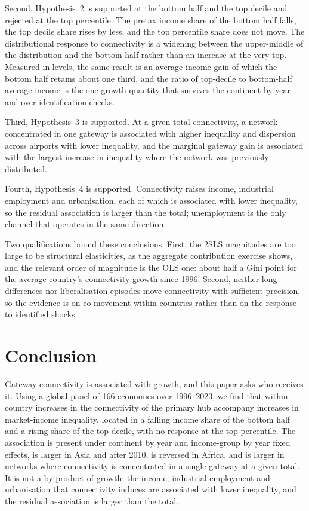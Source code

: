 Second, Hypothesis~2 is supported at the bottom half and the top decile and rejected at the top percentile. The pretax income share of the bottom half falls, the top decile share rises by less, and the top percentile share does not move. The distributional response to connectivity is a widening between the upper-middle of the distribution and the bottom half rather than an increase at the very top. Measured in levels, the same result is an average income gain of which the bottom half retains about one third, and the ratio of top-decile to bottom-half average income is the one growth quantity that survives the continent by year and over-identification checks.

Third, Hypothesis~3 is supported. At a given total connectivity, a network concentrated in one gateway is associated with higher inequality and dispersion across airports with lower inequality, and the marginal gateway gain is associated with the largest increase in inequality where the network was previously distributed.

Fourth, Hypothesis~4 is supported. Connectivity raises income, industrial employment and urbanisation, each of which is associated with lower inequality, so the residual association is larger than the total; unemployment is the only channel that operates in the same direction.

Two qualifications bound these conclusions. First, the 2SLS magnitudes are too large to be structural elasticities, as the aggregate contribution exercise shows, and the relevant order of magnitude is the OLS one: about half a Gini point for the average country's connectivity growth since 1996. Second, neither long differences nor liberalisation episodes move connectivity with sufficient precision, so the evidence is on co-movement within countries rather than on the response to identified shocks.

\section{Conclusion}
\label{sec:conclusion}
Gateway connectivity is associated with growth, and this paper asks who receives it. Using a global panel of 166 economies over 1996--2023, we find that within-country increases in the connectivity of the primary hub accompany increases in market-income inequality, located in a falling income share of the bottom half and a rising share of the top decile, with no response at the top percentile. The association is present under continent by year and income-group by year fixed effects, is larger in Asia and after 2010, is reversed in Africa, and is larger in networks where connectivity is concentrated in a single gateway at a given total. It is not a by-product of growth: the income, industrial employment and urbanisation that connectivity induces are associated with lower inequality, and the residual association is larger than the total.

